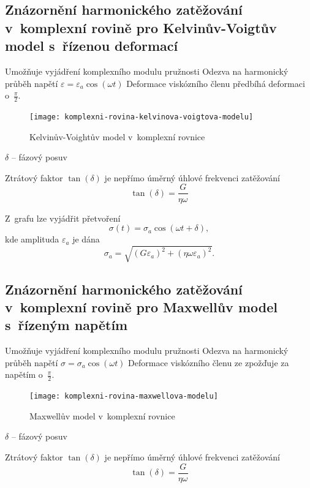 \subsection{Znázornění harmonického zatěžování v~komplexní rovině pro Kelvinův-Voigtův model s~řízenou deformací}
Umožňuje vyjádření komplexního modulu pružnosti
Odezva na harmonický průběh napětí $\varepsilon = \varepsilon_a \cos(\omega t)$
Deformace viskózního členu předbíhá deformaci o~$\frac{\pi}{2}$.

\begin{figure}[H]
	\centering
	\texttt{[image: komplexni-rovina-kelvinova-voigtova-modelu]}
	\caption{Kelvinův-Voightův model v~komplexní rovnice}
	\label{fig:komplexni-rovina-kelvinova-voigtova-modelu}
\end{figure}

$\delta$ -- fázový posuv

Ztrátový faktor $\tan(\delta)$ je nepřímo úměrný úhlové frekvenci zatěžování
\begin{equation}
	\tan(\delta) = \frac{G}{\eta \omega}
\end{equation}

Z~grafu lze vyjádřit přetvoření
\begin{equation}
	\sigma(t) = \sigma_a \cos(\omega t + \delta),
\end{equation}
kde amplituda $\varepsilon_a$ je dána
\begin{equation}
	\sigma_a = \sqrt{\left( G \varepsilon_a \right)^2 + \left( \eta \omega \varepsilon_a \right)^2}.
\end{equation}

\subsection{Znázornění harmonického zatěžování v~komplexní rovině pro Maxwellův model s~řízeným napětím}
Umožňuje vyjádření komplexního modulu pružnosti
Odezva na harmonický průběh napětí $\sigma = \sigma_a \cos(\omega t)$
Deformace viskózního členu ze zpožďuje za napětím o~$\frac{\pi}{2}$.

\begin{figure}[H]
	\centering
	\texttt{[image: komplexni-rovina-maxwellova-modelu]}
	\caption{Maxwellův model v~komplexní rovnice}
	\label{fig:komplexni-rovina-maxwellova-modelu}
\end{figure}

$\delta$ -- fázový posuv

Ztrátový faktor $\tan(\delta)$ je nepřímo úměrný úhlové frekvenci zatěžování
\begin{equation}
	\tan(\delta) = \frac{G}{\eta \omega}
\end{equation}

